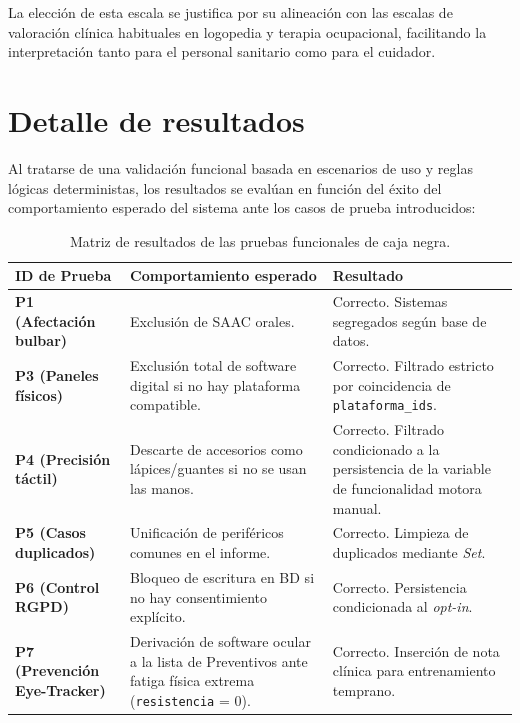 La elección de esta escala se justifica por su alineación con las escalas de valoración clínica habituales en logopedia y terapia ocupacional, facilitando la interpretación tanto para el personal sanitario como para el cuidador. \cite{cedarbaum:alsfrsr}

\section{Detalle de resultados}
Al tratarse de una validación funcional basada en escenarios de uso y reglas lógicas deterministas, los resultados se evalúan en función del éxito del comportamiento esperado del sistema ante los casos de prueba introducidos:

\begin{table}[ht]
    \centering
    \begin{tabularx}{\linewidth}{lXX}
        \toprule
        \textbf{ID de Prueba} & \textbf{Comportamiento esperado} & \textbf{Resultado} \\
        \toprule
        	\textbf{P1 (Afectación bulbar)} & Exclusión de SAAC orales. & Correcto. Sistemas segregados según base de datos. \\
	\textbf{P3 (Paneles físicos)} & Exclusión total de software digital si no hay plataforma compatible. & Correcto. Filtrado estricto por coincidencia de \texttt{plataforma\_ids}. \\
       	\textbf{P4 (Precisión táctil)} & Descarte de accesorios como lápices/guantes si no se usan las manos. & Correcto. Filtrado condicionado a la persistencia de la variable de funcionalidad motora manual.\\
       	\textbf{P5 (Casos duplicados)} & Unificación de periféricos comunes en el informe. & Correcto. Limpieza de duplicados mediante \textit{Set}. \\
      	 \textbf{P6 (Control RGPD)} & Bloqueo de escritura en BD si no hay consentimiento explícito. & Correcto. Persistencia condicionada al \textit{opt-in}. \\
	\textbf{P7 (Prevención Eye-Tracker)} & Derivación de software ocular a la lista de Preventivos ante fatiga física extrema (\texttt{resistencia} = 0). & Correcto. Inserción de nota clínica para entrenamiento temprano. \\
        \bottomrule
    \end{tabularx}
    \caption{Matriz de resultados de las pruebas funcionales de caja negra.}
    \label{tab:resultados_pruebas}
\end{table}